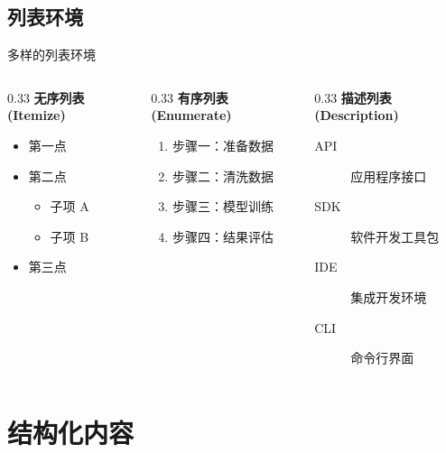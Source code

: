 \subsection{列表环境}
\begin{frame}{多样的列表环境}
    \begin{columns}[T]
        \begin{column}{0.33\textwidth}
            \textbf{\color{main} 无序列表 (Itemize)}
            \begin{itemize}
                \item 第一点
                \item 第二点
                \begin{itemize}
                    \item 子项 A
                    \item 子项 B
                \end{itemize}
                \item 第三点
            \end{itemize}
        \end{column}
        \begin{column}{0.33\textwidth}
            \textbf{\color{main} 有序列表 (Enumerate)}
            \begin{enumerate}
                \item 步骤一：准备数据
                \item 步骤二：清洗数据
                \item 步骤三：模型训练
                \item 步骤四：结果评估
            \end{enumerate}
        \end{column}
        \begin{column}{0.33\textwidth}
            \textbf{\color{main} 描述列表 (Description)}
            \begin{description}
                \item[API] 应用程序接口
                \item[SDK] 软件开发工具包
                \item[IDE] 集成开发环境
                \item[CLI] 命令行界面
            \end{description}
        \end{column}
    \end{columns}
\end{frame}


\section{结构化内容}

